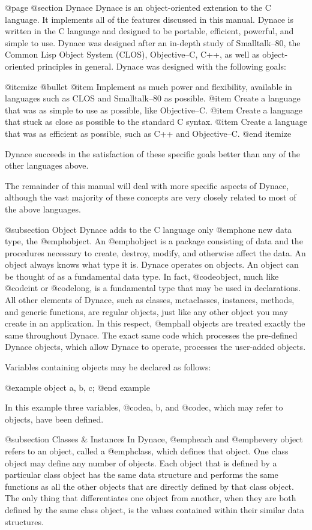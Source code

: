 @page
@section Dynace
Dynace is an object-oriented extension to the C language.  It implements
all of the features discussed in this manual.  Dynace is written in the
C language and designed to be portable, efficient, powerful, and
simple to use.  Dynace was designed after an in-depth study of Smalltalk--80,
the Common Lisp Object System (CLOS), Objective--C, C++, as well as
object-oriented principles in general.  Dynace was designed with the following
goals:

@itemize @bullet
@item  Implement as much power and flexibility, available in languages such
as CLOS and Smalltalk--80 as possible.
@item  Create a language that was as simple to use as possible, like
Objective--C.
@item  Create a language that stuck as close as possible to the standard
C syntax.
@item  Create a language that was as efficient as possible, such as C++
and Objective--C.
@end itemize

Dynace succeeds in the satisfaction of these specific goals better than any
of the other languages above.

The remainder of this manual will deal with more specific aspects of Dynace,
although the vast majority of these concepts are very closely related to
most of the above languages.

@subsection Object
Dynace adds to the C language only @emph{one} new data type, the @emph{object}.
An @emph{object} is a package consisting of data and the procedures
necessary to create, destroy, modify, and otherwise affect the data.  An
object always knows what type it is.  Dynace operates on objects.  An
object can be thought of as a fundamental data type.  In fact,
@code{object}, much like @code{int} or @code{long}, is a fundamental
type that may be used in declarations.  All other elements of Dynace, such
as classes, metaclasses, instances, methods, and generic functions, are
regular objects, just like any other object you may create in an
application.  In this respect, @emph{all} objects are treated exactly
the same throughout Dynace.  The exact same code which processes the pre-defined
Dynace objects, which allow Dynace to operate, processes the user-added objects.

Variables containing objects may be declared as follows:

@example
        object    a, b, c;
@end example

In this example three variables, @code{a, b,} and @code{c}, which may
refer to objects, have been defined.

@subsection Classes & Instances
In Dynace, @emph{each} and @emph{every} object refers to an object, called
a @emph{class}, which defines that object.  One class object may define
any number of objects.  Each object that is defined by a particular
class object has the same data structure and performs the same functions
as all the other objects that are directly defined by that class
object.  The only thing that differentiates one object from another,
when they are both defined by the same class object, is the values
contained within their similar data structures.

